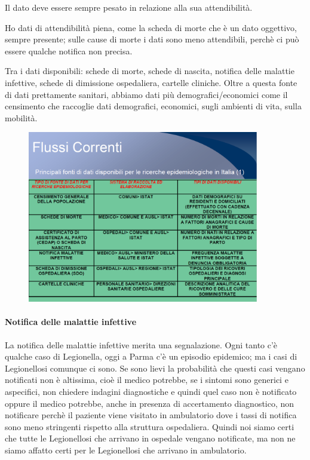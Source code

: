 Il dato deve essere sempre pesato in relazione alla sua attendibilità.

Ho dati di attendibilità piena, come la scheda di morte che è un dato
oggettivo, sempre presente; sulle cause di morte i dati sono meno
attendibili, perchè ci può essere qualche notifica non precisa.

Tra i dati disponibili: schede di morte, schede di nascita, notifica
delle malattie infettive, schede di dimissione ospedaliera, cartelle
cliniche. Oltre a questa fonte di dati prettamente sanitari, abbiamo
dati più demografici/economici come il censimento che raccoglie dati
demografici, economici, sugli ambienti di vita, sulla mobilità.


\begin{figure}[!ht]
\centering
	\includegraphics[width=0.9\textwidth]{02/image1.png}
\end{figure}



\paragraph{Notifica delle malattie infettive}

La notifica delle malattie infettive merita una segnalazione. Ogni tanto
c'è qualche caso di Legionella, oggi a Parma c'è un episodio epidemico;
ma i casi di Legionellosi comunque ci sono. Se sono lievi la probabilità
che questi casi vengano notificati non è altissima, cioè il medico
potrebbe, se i sintomi sono generici e aspecifici, non chiedere indagini
diagnostiche e quindi quel caso non è notificato oppure il medico
potrebbe, anche in presenza di accertamento diagnostico, non notificare
perchè il paziente viene visitato in ambulatorio dove i tassi di
notifica sono meno stringenti rispetto alla struttura ospedaliera.
Quindi noi siamo certi che tutte le Legionellosi che arrivano in
ospedale vengano notificate, ma non ne siamo affatto certi per le
Legionellosi che arrivano in ambulatorio.

